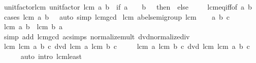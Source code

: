 \begin{isabellebody}
\ unit{\isacharunderscore}{\kern0pt}factor{\isacharunderscore}{\kern0pt}lcm{\isacharcolon}{\kern0pt}\ {\isachardoublequoteopen}unit{\isacharunderscore}{\kern0pt}factor\ {\isacharparenleft}{\kern0pt}lcm\ a\ b{\isacharparenright}{\kern0pt}\ {\isacharequal}{\kern0pt}\ {\isacharparenleft}{\kern0pt}if\ a\ {\isacharequal}{\kern0pt}\ {}\ {\isasymor}\ b\ {\isacharequal}{\kern0pt}\ {}\ then\ {}\ else\ {}{\isacharparenright}{\kern0pt}{\isachardoublequoteclose}\isanewline
%
\isadelimproof
\ \ %
\endisadelimproof
%
\isatagproof
{}\isamarkupfalse%
\ lcm{\isacharunderscore}{\kern0pt}eq{\isacharunderscore}{\kern0pt}{}{\isacharunderscore}{\kern0pt}iff{\isacharbrackleft}{\kern0pt}of\ a\ b{\isacharbrackright}{\kern0pt}\ \isamarkupfalse%
\ {\isacharparenleft}{\kern0pt}cases\ {\isachardoublequoteopen}lcm\ a\ b\ {\isacharequal}{\kern0pt}\ {}{\isachardoublequoteclose}{\isacharparenright}{\kern0pt}\ {\isacharparenleft}{\kern0pt}auto\ simp{\isacharcolon}{\kern0pt}\ lcm{\isacharunderscore}{\kern0pt}gcd{\isacharparenright}{\kern0pt}%
\endisatagproof
{\isafoldproof}%
%
\isadelimproof
\isanewline
%
\endisadelimproof
\isanewline
{}\isamarkupfalse%
\ lcm{\isacharcolon}{\kern0pt}\ abel{\isacharunderscore}{\kern0pt}semigroup\ lcm\isanewline
%
\isadelimproof
%
\endisadelimproof
%
\isatagproof
{}\isamarkupfalse%
\isanewline
\ \ \isamarkupfalse%
\ a\ b\ c\isanewline
\ \ \isamarkupfalse%
\ {\isachardoublequoteopen}lcm\ a\ b\ {\isacharequal}{\kern0pt}\ lcm\ b\ a{\isachardoublequoteclose}\isanewline
\ \ \ \ \isamarkupfalse%
\ {\isacharparenleft}{\kern0pt}simp\ add{\isacharcolon}{\kern0pt}\ lcm{\isacharunderscore}{\kern0pt}gcd\ ac{\isacharunderscore}{\kern0pt}simps\ normalize{\isacharunderscore}{\kern0pt}mult\ dvd{\isacharunderscore}{\kern0pt}normalize{\isacharunderscore}{\kern0pt}div{\isacharparenright}{\kern0pt}\isanewline
\ \ \isamarkupfalse%
\ {\isachardoublequoteopen}lcm\ {\isacharparenleft}{\kern0pt}lcm\ a\ b{\isacharparenright}{\kern0pt}\ c\ dvd\ lcm\ a\ {\isacharparenleft}{\kern0pt}lcm\ b\ c{\isacharparenright}{\kern0pt}{\isachardoublequoteclose}\isanewline
\ \ \ \ \ {\isachardoublequoteopen}lcm\ a\ {\isacharparenleft}{\kern0pt}lcm\ b\ c{\isacharparenright}{\kern0pt}\ dvd\ lcm\ {\isacharparenleft}{\kern0pt}lcm\ a\ b{\isacharparenright}{\kern0pt}\ c{\isachardoublequoteclose}\isanewline
\ \ \ \ \isamarkupfalse%
\ {\isacharparenleft}{\kern0pt}auto\ intro{\isacharcolon}{\kern0pt}\ lcm{\isacharunderscore}{\kern0pt}least\isanewline

\end{isabellebody}
